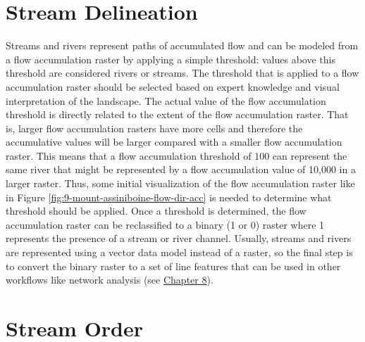 \documentclass[
]{book}
\begin{document}
\hypertarget{stream-delineation}{%
\section{Stream Delineation}\label{stream-delineation}}

Streams and rivers represent paths of accumulated flow and can be modeled from a flow accumulation raster by applying a simple threshold: values above this threshold are considered rivers or streams. The threshold that is applied to a flow accumulation raster should be selected based on expert knowledge and visual interpretation of the landscape. The actual value of the flow accumulation threshold is directly related to the extent of the flow accumulation raster. That is, larger flow accumulation rasters have more cells and therefore the accumulative values will be larger compared with a smaller flow accumulation raster. This means that a flow accumulation threshold of 100 can represent the same river that might be represented by a flow accumulation value of 10,000 in a larger raster. Thus, some initial visualization of the flow accumulation raster like in Figure \ref{fig:9-mount-assiniboine-flow-dir-acc} is needed to determine what threshold should be applied. Once a threshold is determined, the flow accumulation raster can be reclassified to a binary (1 or 0) raster where 1 represents the presence of a stream or river channel. Usually, streams and rivers are represented using a vector data model instead of a raster, so the final step is to convert the binary raster to a set of line features that can be used in other workflows like network analysis (see \href{https://ubc-geomatics-textbook.github.io/geomatics-textbook/network-analysis.html}{Chapter 8}).

\hypertarget{stream-order}{%
\section{Stream Order}\label{stream-order}}
\end{document}
